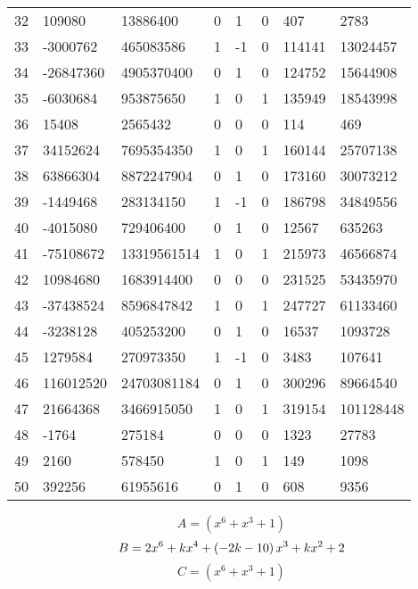 \documentclass{amsart}
\begin{document}
\begin{longtable}{|l|l|l|lllll|}
32&109080&13886400&0&1&0&407&2783\\
33&-3000762&465083586&1&-1&0&114141&13024457\\
34&-26847360&4905370400&0&1&0&124752&15644908\\
35&-6030684&953875650&1&0&1&135949&18543998\\
36&15408&2565432&0&0&0&114&469\\
37&34152624&7695354350&1&0&1&160144&25707138\\
38&63866304&8872247904&0&1&0&173160&30073212\\
39&-1449468&283134150&1&-1&0&186798&34849556\\
40&-4015080&729406400&0&1&0&12567&635263\\
41&-75108672&13319561514&1&0&1&215973&46566874\\
42&10984680&1683914400&0&0&0&231525&53435970\\
43&-37438524&8596847842&1&0&1&247727&61133460\\
44&-3238128&405253200&0&1&0&16537&1093728\\
45&1279584&270973350&1&-1&0&3483&107641\\
46&116012520&24703081184&0&1&0&300296&89664540\\
47&21664368&3466915050&1&0&1&319154&101128448\\
48&-1764&275184&0&0&0&1323&27783\\
49&2160&578450&1&0&1&149&1098\\
50&392256&61955616&0&1&0&608&9356\\
\hline
\end{longtable}
$$A=(x^6
 + x^3
 + 1)$$
$$B=2\*x^6
 + k\*x^4
 + \left(-2\*k
 - 10\right) \*x^3
 + k\*x^2
 + 2$$
$$C=(x^6
 + x^3
 + 1)$$
\end{document}
